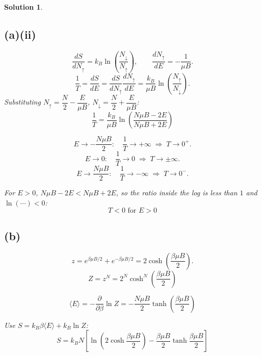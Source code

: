 \documentclass[11pt]{article}
\newtheorem*{solution}{Solution}
\begin{document}
\begin{solution}
\subsection*{(a)(ii)}
\[
\frac{dS}{dN_\uparrow}=k_B\ln\!\left(\frac{N_\downarrow}{N_\uparrow}\right),
\qquad
\frac{dN_\uparrow}{dE}=-\frac{1}{\mu B}.
\]
\[
\frac1T=\frac{dS}{dE}=\frac{dS}{dN_\uparrow}\frac{dN_\uparrow}{dE}
=\frac{k_B}{\mu B}\ln\!\left(\frac{N_\uparrow}{N_\downarrow}\right).
\]
Substituting $N_\uparrow=\dfrac{N}{2}-\dfrac{E}{\mu B}$, $N_\downarrow=\dfrac{N}{2}+\dfrac{E}{\mu B}$:
\[
\boxed{\frac1T=\frac{k_B}{\mu B}\ln\!\left(\frac{N\mu B-2E}{N\mu B+2E}\right)}
\]

\begin{center}
\end{center}

\[
E\to-\frac{N\mu B}{2}:\quad \frac1T\to+\infty \;\Rightarrow\; T\to0^+.
\]
\[
E\to0:\quad \frac1T\to0 \;\Rightarrow\; T\to\pm\infty.
\]
\[
E\to\frac{N\mu B}{2}:\quad \frac1T\to-\infty \;\Rightarrow\; T\to0^-.
\]

For $E>0$, $N\mu B-2E<N\mu B+2E$, so the ratio inside the log is less than $1$ and
$\ln(\cdots)<0$:
\[
\boxed{T<0 \text{ for } E>0}
\]

\subsection*{(b)}
\[
z=e^{\beta\mu B/2}+e^{-\beta\mu B/2}=2\cosh\!\left(\frac{\beta\mu B}{2}\right).
\]
\[
\boxed{Z=z^N=2^N\cosh^N\!\left(\frac{\beta\mu B}{2}\right)}
\]

\[
\langle E\rangle=-\frac{\partial}{\partial\beta}\ln Z
=\boxed{-\frac{N\mu B}{2}\tanh\!\left(\frac{\beta\mu B}{2}\right)}
\]

Use $S=k_B\beta\langle E\rangle+k_B\ln Z$:
\[
\boxed{S=k_BN\left[\ln\!\left(2\cosh\frac{\beta\mu B}{2}\right)-\frac{\beta\mu B}{2}\tanh\frac{\beta\mu B}{2}\right]}
\]


\end{solution}
\end{document}
